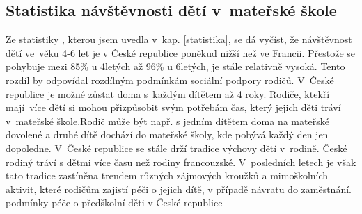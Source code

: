 			\subsection{Statistika návštěvnosti dětí v mateřské škole}
				Ze statistiky \cite{Eurydice}, kterou jsem uvedla v kap. \ref{statistika}, se dá vyčíst, že návštěvnost dětí ve věku 4-6 let je v České republice poněkud nižší než ve Francii. Přestože se pohybuje mezi 85\% u 4letých až 96\% u 6letých, je stále relativně vysoká. Tento rozdíl by odpovídal rozdílným podmínkám sociální podpory rodičů. V České republice je možné zůstat doma s každým dítětem až 4 roky. Rodiče, ktekří mají více dětí si mohou přizpůsobit svým potřebám čas, který jejich děti tráví v mateřské škole.Rodič může být např. s jedním dítětem doma na mateřské dovolené a druhé dítě dochází do mateřské školy, kde pobývá každý den jen dopoledne. V České republice se stále drží tradice výchovy dětí v rodině. České rodiný tráví s dětmi více času než rodiny francouzské. V posledních letech je však tato tradice zastíněna trendem různých zájmových kroužků a mimoškolních aktivit, které rodičům zajistí péči o jejich dítě, v případě návratu do zaměstnání.  
				podmínky péče o předškolní děti v České republice	

